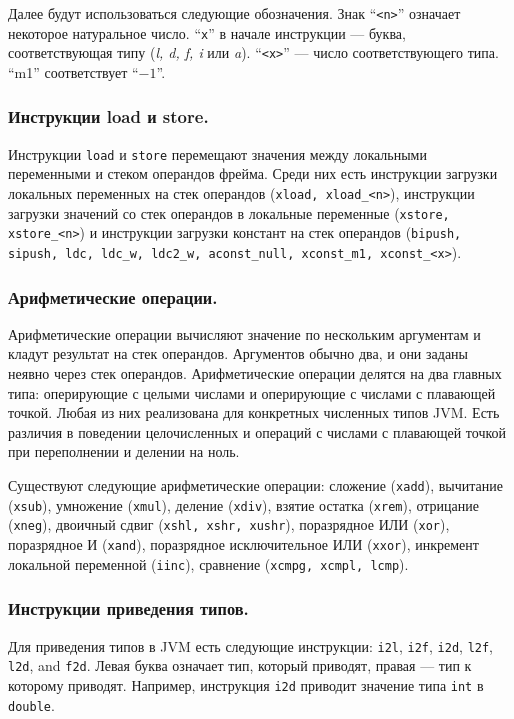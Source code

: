 Далее будут использоваться следующие обозначения. Знак ``\texttt{<n>}'' означает некоторое натуральное число. ``\texttt{x}'' в начале инструкции --- буква, 
соответствующая типу (\textit{l, d, f, i} или \textit{a}). ``\texttt{<x>}'' --- число соответствующего типа. ``m1'' соответствует ``$-1$''.

\subsubsection{Инструкции load и store.}

Инструкции \texttt{load} и \texttt{store} перемещают значения между локальными переменными и стеком операндов фрейма. Среди них есть 
инструкции загрузки локальных переменных на стек операндов (\texttt{xload, xload\_<n>}), инструкции загрузки значений со стек
операндов в локальные переменные (\texttt{xstore, xstore\_<n>}) и инструкции загрузки констант на стек операндов (\texttt{bipush, sipush, ldc, ldc\_w, ldc2\_w, aconst\_null, xconst\_m1, xconst\_<x>}). 

\subsubsection{Арифметические операции.}
Арифметические операции вычисляют значение по нескольким аргументам и кладут результат на стек операндов. Аргументов обычно два, и они заданы неявно через стек операндов. Арифметические операции делятся на два главных типа: оперирующие с целыми числами и оперирующие с числами с плавающей точкой. Любая из них реализована для конкретных численных типов JVM. Есть различия в поведении целочисленных и операций с числами с плавающей точкой при переполнении и делении на ноль. 

Существуют следующие арифметические операции: сложение (\texttt{xadd}), вычитание (\texttt{xsub}), умножение (\texttt{xmul}), деление (\texttt{xdiv}), взятие остатка (\texttt{xrem}), отрицание (\texttt{xneg}), двоичный сдвиг (\texttt{xshl, xshr, xushr}), поразрядное ИЛИ (\texttt{xor}), поразрядное И (\texttt{xand}), поразрядное исключительное ИЛИ (\texttt{xxor}), инкремент локальной переменной (\texttt{iinc}), сравнение (\texttt{xcmpg, xcmpl, lcmp}).

\subsubsection{Инструкции приведения типов.}
Для приведения типов в JVM есть следующие инструкции: \texttt{i2l}, \texttt{i2f}, \texttt{i2d}, \texttt{l2f}, \texttt{l2d}, and \texttt{f2d}. 
Левая буква означает тип, который приводят, правая --- тип к которому приводят. Например,  инструкция \texttt{i2d} приводит значение типа \texttt{int} в \texttt{double}.
  
